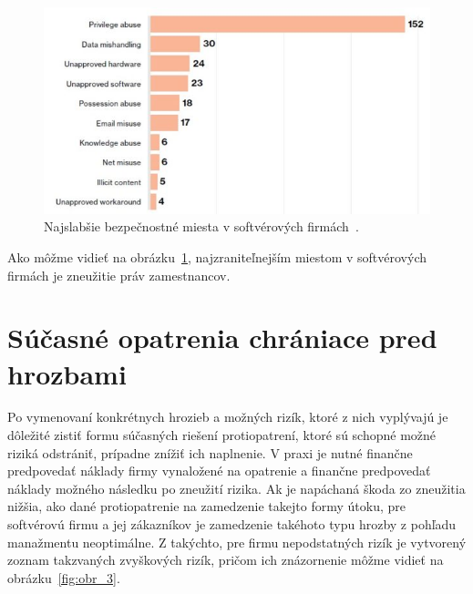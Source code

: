 \begin{figure}[H]
\begin{center}\includegraphics[width=\textwidth,height=6cm,keepaspectratio=true]{assets/priviledge_abuse.jpg}\end{center}
\caption[Najslabšie bezpečnostné miesta v softvérových firmách]{Najslabšie bezpečnostné miesta v softvérových firmách~\cite{WeaknestLink}.}\label{fig:obr_2}
\end{figure}

Ako môžme vidieť na obrázku~\ref{fig:obr_2}, najzraniteľnejším miestom v softvérových firmách je zneužitie práv zamestnancov.

\section{Súčasné opatrenia chrániace pred hrozbami}\label{sec:podsekcia-2}

Po vymenovaní konkrétnych hrozieb a možných rizík, ktoré z nich vyplývajú je dôležité zistiť formu súčasných riešení
protiopatrení, ktoré sú schopné možné riziká odstrániť, prípadne znížiť ich naplnenie.
V praxi je nutné finančne predpovedať náklady firmy vynaložené na opatrenie a finančne predpovedať náklady možného
následku po zneužití rizika.
Ak je napáchaná škoda zo zneužitia nižšia, ako dané protiopatrenie na zamedzenie takejto formy útoku, pre softvérovú
firmu a jej zákazníkov je zamedzenie takéhoto typu hrozby z pohľadu manažmentu neoptimálne.
Z takýchto, pre firmu nepodstatných rizík je vytvorený zoznam takzvaných zvyškových rizík, pričom ich znázornenie môžme
vidieť na obrázku~\ref{fig:obr_3}.

